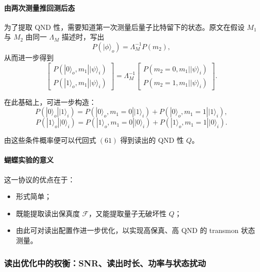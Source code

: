 \documentclass[12pt,a4paper,oneside]{ctexbook}
\begin{document}
\paragraph{由两次测量推回测后态}
为了提取 QND 性，需要知道第一次测量后量子比特留下的状态。原文在假设 \(M_1\) 与 \(M_2\) 由同一 \(\Lambda_M\) 描述时，写出
\begin{equation}
P(|\phi\rangle_o)=\Lambda_M^{-1}P(m_2),
\tag{63}
\end{equation}
从而进一步得到
\begin{equation}
\begin{bmatrix}
P(|0\rangle_o,m_1||\psi\rangle_i)\\
P(|1\rangle_o,m_1||\psi\rangle_i)
\end{bmatrix}
=
\Lambda_M^{-1}
\begin{bmatrix}
P(m_2=0,m_1||\psi\rangle_i)\\
P(m_2=1,m_1||\psi\rangle_i)
\end{bmatrix}.
\tag{64}
\end{equation}

在此基础上，可进一步构造：
\begin{equation}
P(|0\rangle_o||1\rangle_i)
=
P(|0\rangle_o,m_1=0||1\rangle_i)
+
P(|0\rangle_o,m_1=1||1\rangle_i),
\tag{65}
\end{equation}
\begin{equation}
P(|1\rangle_o||0\rangle_i)
=
P(|1\rangle_o,m_1=0||0\rangle_i)
+
P(|1\rangle_o,m_1=1||0\rangle_i).
\tag{66}
\end{equation}

由这些条件概率便可以代回式 \((61)\) 得到读出的 QND 性 \(Q\)。

\paragraph{蝴蝶实验的意义}
这一协议的优点在于：
\begin{itemize}
    \item 形式简单；
    \item 既能提取读出保真度 \(\mathcal{F}\)，又能提取量子无破坏性 \(Q\)；
    \item 由此可对读出配置作进一步优化，以实现高保真、高 QND 的 transmon 状态测量。
\end{itemize}

\subsubsection{读出优化中的权衡：SNR、读出时长、功率与状态扰动}
\end{document}
